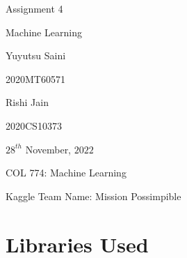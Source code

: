 \documentclass[11pt]{article}
\newcommand\titleofdoc{Assignment 4}
\newcommand\GroupName{Machine Learning}
\begin{document}
\begin{center}
        \vspace*{2cm} %

        \Huge{\titleofdoc} 
            
        \vspace{2 cm}
        \Large{\GroupName}
       
        \vspace{0.25cm}
        \large{Yuyutsu Saini}

        
        \vspace{0.25cm}
        \large{ 2020MT60571}
        
        \vspace{0.25cm}
        \large{ Rishi Jain}

        
        \vspace{0.25cm}
        \large{2020CS10373}     
       
        \vspace{3 cm}
        \Large{$28^{th}$ November, $2022$}
        
        \vspace{0.25 cm}
        \Large{COL 774: Machine Learning}

            
        \vspace{0.25 cm}
        \Large{Kaggle Team Name: Mission Possimpible}
\end{center}
\vspace{1cm}
\newpage
\section*{Libraries Used}
\end{document}
